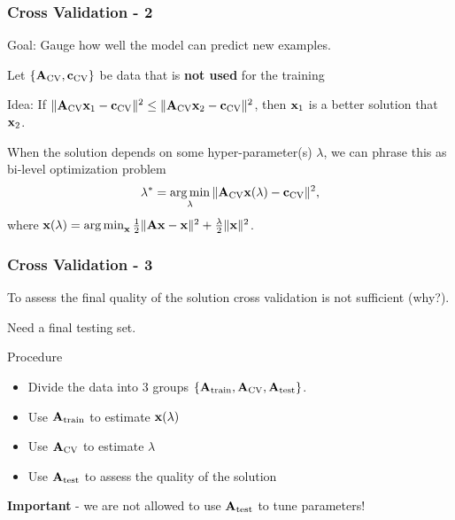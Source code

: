 \documentclass[12pt,fleqn,handout]{beamer}
\begin{document}
\begin{frame}
	\frametitle{Cross Validation - 2}

Goal: Gauge how well the model can predict new examples.

\bigskip

Let $\{ {\bf A}_{\rm CV}, {\bf c}_{\rm CV} \}$ be data that is {\bf not used} for the training 

\bigskip

Idea: If $\|{\bf A}_{\rm CV} {\bf x}_1 - {\bf c}_{\rm CV}\|^2 \le 
\|{\bf A}_{\rm CV} {\bf x}_2 - {\bf c}_{\rm CV}\|^2$,
then ${\bf x}_1$ is a better solution that ${\bf x}_2$.

\bigskip

\pause

When the solution depends on some hyper-parameter(s) $\lambda$, we can phrase this as bi-level optimization problem
\begin{equation*}
 \lambda^* = \operatorname*{arg\,min}_{\lambda} \|{\bf A}_{\rm CV} {\bf x}(\lambda) - {\bf c}_{\rm CV}\|^2,
\end{equation*}
where  ${\bf x}(\lambda) = \operatorname*{arg\,min}_{\bf x} {\frac 12}\|{\bf A} {\bf x} - {\bf x} \|^2 + \frac{\lambda}{2} \|{\bf x}\|^2$.

\end{frame}

\begin{frame}
	\frametitle{Cross Validation - 3}

To assess the final quality of the solution cross validation is not sufficient (why?).

\bigskip

Need a final testing set.

\bigskip

Procedure
\begin{itemize}
\item Divide the data into 3 groups $\{ {\bf A}_{\rm train}, {\bf A}_{\rm CV}, {\bf A}_{\rm test} \}$.
\item Use ${\bf A}_{\rm train}$ to estimate ${\bf x}(\lambda)$
\item Use ${\bf A}_{\rm CV}$ to estimate $\lambda$
\item Use ${\bf A}_{\rm test}$ to assess the quality of the solution
\end{itemize}

\pause

{\bf Important} -  we are not allowed to use ${\bf A}_{\rm test}$ to tune parameters!

\end{frame}

%
\end{document}
